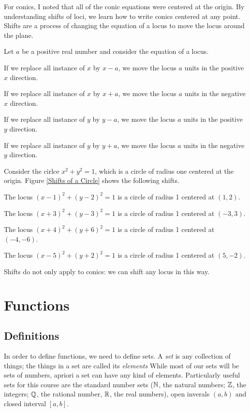 \documentclass[fleqn]{report}
\begin{document}
For conics, I noted that all of the conic equations were
centered at the origin. By understanding shifts of loci, we
learn how to write conics centered at any point. Shifts are a
process of changing the equation of a locus to move the locus
around the plane. 

Let $a$ be a positive real number and consider the equation of
a locus.
\begin{smallitemize}
\item If we replace all instance of $x$ by $x-a$, we move the
locus $a$ units in the positive $x$ direction.
\item If we replace all instance of $x$ by $x+a$, we move the
locus $a$ units in the negative $x$ direction.
\item If we replace all instance of $y$ by $y-a$, we move the
locus $a$ units in the positive $y$ direction.
\item If we replace all instance of $y$ by $y+a$, we move the
locus $a$ units in the negative $y$ direction.
\end{smallitemize}
Consider the cirlce $x^2 + y^2 = 1$, which is a circle of
radius one centered at the origin. Figure \ref{Shifts of a
Circle} shows the following shifts.
\begin{smallitemize}
\item The locus $(x-1)^2 + (y-2)^2 = 1$ is a circle of radius
1 centered at $(1,2)$.
\item The locus $(x+3)^2 + (y-3)^2 = 1$ is a circle of radius
1 centered at $(-3,3)$.
\item The locus $(x+4)^2 + (y+6)^2 = 1$ is a circle of radius
1 centered at $(-4,-6)$.
\item The locus $(x-5)^2 + (y+2)^2 = 1$ is a circle of radius
1 centered at $(5,-2)$.
\end{smallitemize}
Shifts do not only apply to conics: we can shift any locus in
this way.

\chapter{Functions}
\label{Functions}

\section*{Definitions}

In order to define functions, we need to define sets. A
\emph{set} is any collection of things; the things in a set
are called its \emph{elements} While most of our sets will be
sets of numbers, apriori a set can have any kind of elements. 
Particularly useful sets for this course are the standard
number sets ($\mathbb{N}$, the natural numbers; $\mathbb{Z}$, the integers;
$\mathbb{Q}$, the rational number, $\mathbb{R}$, the real numbers), open
inverals $(a,b)$ and closed interval $[a,b]$.
\end{document}
